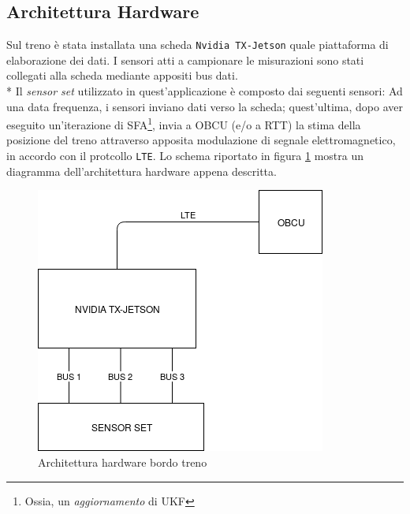 \subsection{Architettura Hardware}
Sul treno \`e stata installata una scheda \texttt{Nvidia TX-Jetson} quale piattaforma di elaborazione dei dati. I sensori atti a campionare le misurazioni sono stati collegati alla scheda mediante appositi bus dati.\\*
Il \emph{sensor set} utilizzato in quest'applicazione \`e composto dai seguenti sensori:
 Ad una data frequenza, i sensori inviano dati verso la scheda; quest'ultima, dopo aver eseguito un'iterazione di SFA\footnote{Ossia, un \emph{aggiornamento} di UKF}, invia a OBCU (e/o a RTT) la stima della posizione del treno attraverso apposita modulazione di segnale elettromagnetico, in accordo con il protcollo \texttt{LTE}. Lo schema riportato in figura \ref{fig:tdiagram} mostra un diagramma dell'architettura hardware appena descritta.
\begin{figure}[h]
	\centering
	\includegraphics[width=0.7\linewidth]{img/TrainDiagram}
	\caption{Architettura hardware bordo treno}
	\label{fig:tdiagram}
\end{figure}
